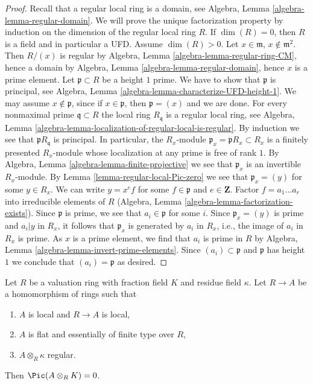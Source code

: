 \begin{proof}
Recall that a regular local ring is a domain, see
Algebra, Lemma \ref{algebra-lemma-regular-domain}.
We will prove the unique factorization property
by induction on the dimension of the regular local ring $R$.
If $\dim(R) = 0$, then $R$ is a field and in particular a UFD.
Assume $\dim(R) > 0$. Let $x \in \mathfrak m$, $x \not \in \mathfrak m^2$.
Then $R/(x)$ is regular by Algebra, Lemma \ref{algebra-lemma-regular-ring-CM},
hence a domain by
Algebra, Lemma \ref{algebra-lemma-regular-domain},
hence $x$ is a prime element.
Let $\mathfrak p \subset R$ be a height $1$ prime. We have
to show that $\mathfrak p$ is principal, see
Algebra, Lemma \ref{algebra-lemma-characterize-UFD-height-1}.
We may assume $x \not \in \mathfrak p$, since if $x \in \mathfrak p$,
then $\mathfrak p = (x)$ and we are done.
For every nonmaximal prime $\mathfrak q \subset R$
the local ring $R_\mathfrak q$ is a regular local ring, see
Algebra, Lemma \ref{algebra-lemma-localization-of-regular-local-is-regular}.
By induction we see that $\mathfrak pR_\mathfrak q$ is principal.
In particular, the $R_x$-module $\mathfrak p_x = \mathfrak pR_x \subset R_x$
is a finitely presented $R_x$-module whose localization at
any prime is free of rank $1$. 
By Algebra, Lemma \ref{algebra-lemma-finite-projective}
we see that $\mathfrak p_x$ is an invertible $R_x$-module.
By Lemma \ref{lemma-regular-local-Pic-zero} we see that
$\mathfrak p_x = (y)$ for some $y \in R_x$.
We can write $y = x^e f$ for some $f \in \mathfrak p$ and $e \in \mathbf{Z}$.
Factor $f = a_1 \ldots a_r$ into irreducible elements of $R$
(Algebra, Lemma \ref{algebra-lemma-factorization-exists}).
Since $\mathfrak p$ is prime, we see that $a_i \in \mathfrak p$
for some $i$. Since $\mathfrak p_x = (y)$ is prime and
$a_i | y$ in $R_x$, it follows that $\mathfrak p_x$ is generated by
$a_i$ in $R_x$, i.e., the image of $a_i$ in $R_x$ is prime.
As $x$ is a prime element, we find that $a_i$ is prime in $R$ by
Algebra, Lemma \ref{algebra-lemma-invert-prime-elements}.
Since $(a_i) \subset \mathfrak p$ and $\mathfrak p$ has height
$1$ we conclude that $(a_i) = \mathfrak p$ as desired.
\end{proof}

\begin{lemma}
\label{lemma-picard-group-generic-fibre-regular}
Let $R$ be a valuation ring with fraction field $K$
and residue field $\kappa$. Let $R \to A$ be a
homomorphism of rings such that
\begin{enumerate}
\item $A$ is local and $R \to A$ is local,
\item $A$ is flat and essentially of finite type over $R$,
\item $A \otimes_R \kappa$ regular.
\end{enumerate}
Then $\Pic(A \otimes_R K) = 0$.
\end{lemma}

